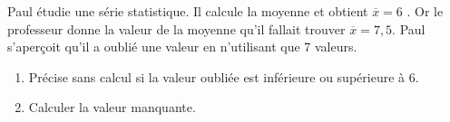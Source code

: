 
Paul étudie une série statistique. Il calcule la moyenne et obtient $\overline{x}=6$ .
Or le professeur donne la valeur de la moyenne qu'il fallait trouver $\overline{x}=7,5$.
Paul s'aperçoit qu'il a oublié une valeur en n'utilisant que 7 valeurs.
\begin{enumerate}
\item Précise sans calcul si la valeur oubliée est inférieure ou supérieure à 6.
\item Calculer la valeur manquante.
\end{enumerate}